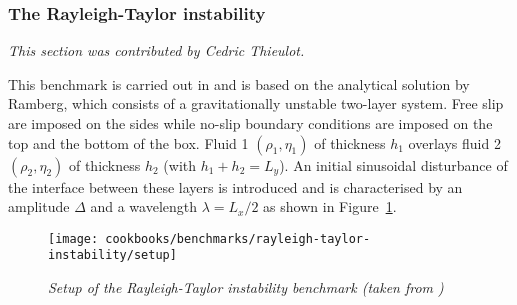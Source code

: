 \documentclass{article}
\begin{document}
\subsubsection{The Rayleigh-Taylor instability}
\label{sec:benchmark-rayleigh-taylor}

\textit{This section was contributed by Cedric Thieulot.}

This benchmark is carried out in \cite{Deu08,Ger10,thie11} and is 
based on the analytical solution by Ramberg\cite{ramb68}, 
which  consists of a gravitationally unstable two-layer system.
Free slip are imposed on the sides while no-slip boundary conditions are imposed on the
top and the bottom of the box.
Fluid 1 $(\rho_1,\eta_1)$ of thickness $h_1$ overlays 
fluid 2 $(\rho_2,\eta_2)$ of thickness $h_2$ (with $h_1+h_2=L_y$).
An initial sinusoidal disturbance of the interface between these
layers is introduced and is characterised by an amplitude $\Delta$ and a
wavelength $\lambda=L_x/2$ as shown in Figure~\ref{fig:RTi_setup}.

\begin{figure}
  \centering
  \texttt{[image: cookbooks/benchmarks/rayleigh-taylor-instability/setup]}
  \caption{\it Setup of the Rayleigh-Taylor instability benchmark (taken from \cite{thie11})} 
  \label{fig:RTi_setup}
\end{figure}
\end{document}
